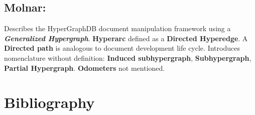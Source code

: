 \documentclass[10pt]{article}
\begin{document}
\subsection{Molnar: ~\cite{molnar2014applications}}
Describes the HyperGraphDB document manipulation framework using a \textbf{\textit{Generalized Hypergraph}}. \textbf{Hyperarc} defined as a \textbf{Directed Hyperedge}. A \textbf{Directed path} is analogous to document development life cycle. Introduces nomenclature without definition: \textbf{Induced subhypergraph}, \textbf{Subhypergraph}, \textbf{Partial Hypergraph}. \textbf{Odometers} not mentioned.


\newpage
\section{Bibliography}
\nocite{*}


\end{document}
